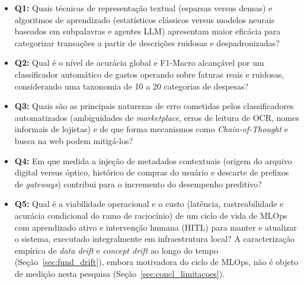 \begin{itemize}
	\item \textbf{Q1:} Quais técnicas de representação textual (esparsas versus densas) e algoritmos de aprendizado (estatísticos clássicos versus modelos neurais baseados em subpalavras e agentes LLM) apresentam maior eficácia para categorizar transações a partir de descrições ruidosas e despadronizadas?
	\item \textbf{Q2:} Qual é o nível de acurácia global e F1-Macro alcançável por um classificador automático de gastos operando sobre faturas reais e ruidosas, considerando uma taxonomia de 10 a 20 categorias de despesas?
	\item \textbf{Q3:} Quais são as principais naturezas de erro cometidas pelos classificadores automatizados (ambiguidades de \textit{marketplace}, erros de leitura de OCR, nomes informais de lojistas) e de que forma mecanismos como \textit{Chain-of-Thought} e busca na web podem mitigá-los?
	\item \textbf{Q4:} Em que medida a injeção de metadados contextuais (origem do arquivo digital versus óptico, histórico de compras do usuário e descarte de prefixos de \textit{gateways}) contribui para o incremento do desempenho preditivo?
	\item \textbf{Q5:} Qual é a viabilidade operacional e o custo (latência, rastreabilidade e acurácia condicional do ramo de raciocínio) de um ciclo de vida de MLOps com aprendizado ativo e intervenção humana (HITL) para manter e atualizar o sistema, executado integralmente em infraestrutura local? A caracterização empírica de \textit{data drift} e \textit{concept drift} ao longo do tempo (Seção~\ref{sec:fund_drift}), embora motivadora do ciclo de MLOps, não é objeto de medição nesta pesquisa (Seção~\ref{sec:concl_limitacoes}).
\end{itemize}

